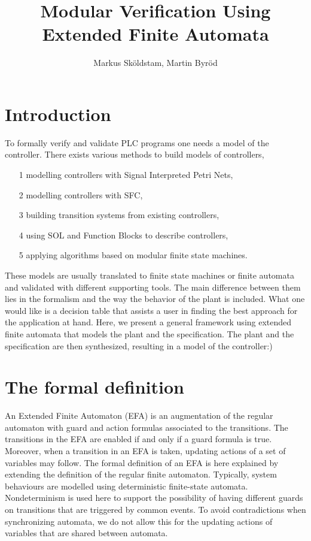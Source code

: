 \documentclass{article}
\begin{document}
\title{Modular Verification Using Extended Finite Automata}
\author{Markus Sk\"oldstam, Martin Byr\"od}
\maketitle
\tableofcontents
\section{Introduction}
To formally verify and validate PLC programs one needs a model of the controller.
There exists various methods to build models of
controllers,
\begin{enumerate}
   \item [1] modelling controllers with Signal Interpreted Petri Nets,
   \item [2] modelling controllers with SFC,
   \item [3] building transition systems from existing controllers,
   \item [4] using SOL and Function Blocks to describe controllers,
   \item [5] applying algorithms based on modular finite state machines.

   \end{enumerate}
 These models are usually translated to finite state machines
 or finite automata and validated with different supporting tools. The main difference
 between them lies in the formalism and the way the behavior of the plant is included.
 What one would like is a decision table that assists a user in finding
 the best approach for the application at hand. Here, we present a general framework using
 extended finite automata that models the plant and the specification.
 The plant and the specification are then synthesized, resulting in a model of the controller:)



\section{The formal definition}
An Extended Finite Automaton (EFA) is an
augmentation of the regular automaton with guard and action
formulas associated to the transitions. The transitions in the EFA
are enabled if and only if a guard formula is true. Moreover, when
a transition in an EFA is taken, updating actions of a set of
variables may follow. The formal definition of an EFA is here
explained by extending the definition of the regular finite automaton.
Typically, system behaviours are modelled using deterministic finite-state automata.
Nondeterminism is used here to support the possibility of having different guards on transitions
that are triggered by common events. To avoid contradictions when synchronizing
automata, we do not allow this for the updating actions of variables
that are shared between automata.\\
\end{document}
